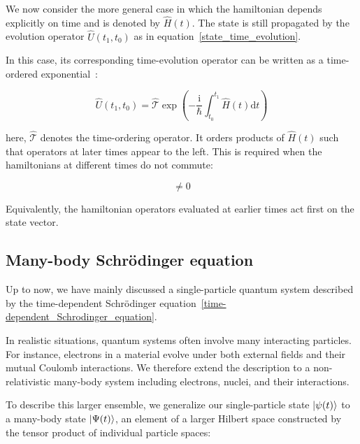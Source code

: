 
We now consider the more general case in which the hamiltonian depends explicitly on time and is denoted by $\hat{H}(t)$.
The state is still propagated by the evolution operator $\hat{U}(t_1,t_0)$ as in equation~\eqref{state_time_evolution}.

In this case, its corresponding time-evolution operator can be written as a time-ordered exponential~\cite{sakurai2020modern}:

\begin{equation}
    \hat{U}(t_1,t_0)=\hat{\mathcal{T}}\exp\left(-\frac{\mathrm{i}}{\hbar}\int_{t_0}^{t_1}\hat{H}(t)\mathrm{d}t\right)
\label{time-ordering_operator}
\end{equation}

here, $\hat{\mathcal{T}}$ denotes the time-ordering operator.
It orders products of $\hat{H}(t)$ such that operators at later times appear to the left.
This is required when the hamiltonians at different times do not commute:

\begin{equation}
    [\hat{H}(t),\hat{H}(t')]\neq 0
\label{hamiltonian_noncommutativity}
\end{equation}

Equivalently, the hamiltonian operators evaluated at earlier times act first on the state vector.

\FloatBarrier
\subsection{Many-body Schrödinger equation}
\label{sec:manybody_schrodinger_equation}

Up to now, we have mainly discussed a single-particle quantum system described by the time-dependent Schrödinger equation~\eqref{time-dependent_Schrodinger_equation}.

In realistic situations, quantum systems often involve many interacting particles.
For instance, electrons in a material evolve under both external fields and their mutual Coulomb interactions.
We therefore extend the description to a non-relativistic many-body system including electrons, nuclei, and their interactions.

To describe this larger ensemble, we generalize our single-particle state $\ket{\psi(t)}$ to a many-body state $\ket{\Psi(t)}$, an element of a larger Hilbert space constructed by the tensor product of individual particle spaces:

